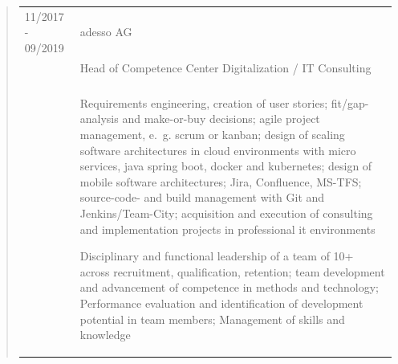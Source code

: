 	\begin{quote}
		\begin{tabular}{p{4cm}l}
			11/2017 - 09/2019&adesso AG\\
			&Head of Competence Center Digitalization / IT Consulting\\
			\\
			&\begin{minipage}{10cm}
				Requirements engineering, creation of user stories; fit/gap-analysis and make-or-buy decisions; agile project management, e.~g. scrum or  kanban; design of scaling software architectures in cloud environments with micro services, java spring boot, docker and kubernetes; design of mobile software architectures; Jira, Confluence, MS-TFS; source-code- and build management with Git and Jenkins/Team-City; acquisition and execution of consulting and implementation projects in professional it environments\newline
				
				Disciplinary and functional leadership of a team of 10+ across recruitment, qualification, retention; team development and advancement of competence in methods and technology; Performance evaluation and identification of development potential in team members; Management of skills and knowledge%
			\end{minipage}
		\end{tabular}
	\end{quote}
